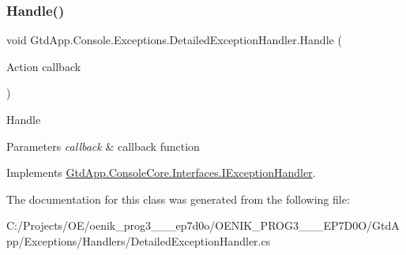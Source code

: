 \subsubsection{\texorpdfstring{Handle()}{Handle()}}
{\footnotesize\ttfamily void Gtd\+App.\+Console.\+Exceptions.\+Detailed\+Exception\+Handler.\+Handle (\begin{DoxyParamCaption}\item[{Action}]{callback }\end{DoxyParamCaption})}



Handle 


\begin{DoxyParams}{Parameters}
{\em callback} & callback function\\
\hline
\end{DoxyParams}


Implements \mbox{\hyperlink{interface_gtd_app_1_1_console_core_1_1_interfaces_1_1_i_exception_handler_a4d0af5418cd0b240e5e1e437e2b571d9}{Gtd\+App.\+Console\+Core.\+Interfaces.\+I\+Exception\+Handler}}.



The documentation for this class was generated from the following file\+:\begin{DoxyCompactItemize}
\item 
C\+:/\+Projects/\+O\+E/oenik\+\_\+prog3\+\_\+\_\+\_\+ep7d0o/\+O\+E\+N\+I\+K\+\_\+\+P\+R\+O\+G3\+\_\+\_\+\_\+\+E\+P7\+D0\+O/\+Gtd\+App/\+Exceptions/\+Handlers/Detailed\+Exception\+Handler.\+cs\end{DoxyCompactItemize}

